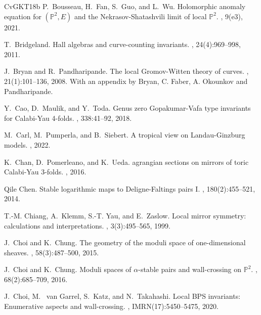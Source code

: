 \documentclass[11pt,letterpaper]{amsart}
\newcommand\PP{\mathbb P}
\begin{document}
\begin{thebibliography}{CvGKT18b}
P.~Bousseau, H.~Fan, S.~Guo, and L.~Wu.
\newblock Holomorphic anomaly equation for $(\PP^2,E)$ and the Nekrasov-Shatashvili limit of local $\PP^2$.
, 9(e3), 2021.

T.~Bridgeland.
\newblock Hall algebras and curve-counting invariants.
,
24(4):969--998, 2011.
      

J.~Bryan and R.~Pandharipande.
\newblock The local {G}romov-{W}itten theory of curves.
, 21(1):101--136, 2008.
\newblock With an appendix by Bryan, C. Faber, A. Okounkov and Pandharipande.


Y.~Cao, D.~Maulik, and Y.~Toda.
\newblock Genus zero {G}opakumar-{V}afa type invariants for {C}alabi-{Y}au
  4-folds.
, 338:41--92, 2018.

M.~Carl, M.~Pumperla, and B.~Siebert.
\newblock A tropical view on {L}andau-{G}inzburg models.
, 2022.

K.~Chan, D.~Pomerleano, and K.~Ueda.
agrangian sections on mirrors of toric {C}alabi-{Y}au 3-folds.
, 2016.

Qile Chen.
\newblock Stable logarithmic maps to {D}eligne-{F}altings pairs {I}.
, 180(2):455--521, 2014.

T.-M. Chiang, A.~Klemm, S.-T. Yau, and E.~Zaslow.
\newblock Local mirror symmetry: calculations and interpretations.
, 3(3):495--565, 1999.


J.~Choi and K.~Chung.
\newblock The geometry of the moduli space of one-dimensional sheaves.
, 58(3):487--500, 2015.

J.~Choi and K.~Chung.
\newblock Moduli spaces of $\alpha$-stable pairs and wall-crossing on
  $\mathbb{P}^2$.
, 68(2):685--709, 2016.


J.~Choi, M.~ van Garrel, S.~Katz, and N.~Takahashi.
\newblock Local {BPS} invariants: Enumerative aspects and wall-crossing.
, IMRN(17):5450--5475, 2020. 


\end{thebibliography}
\end{document}

